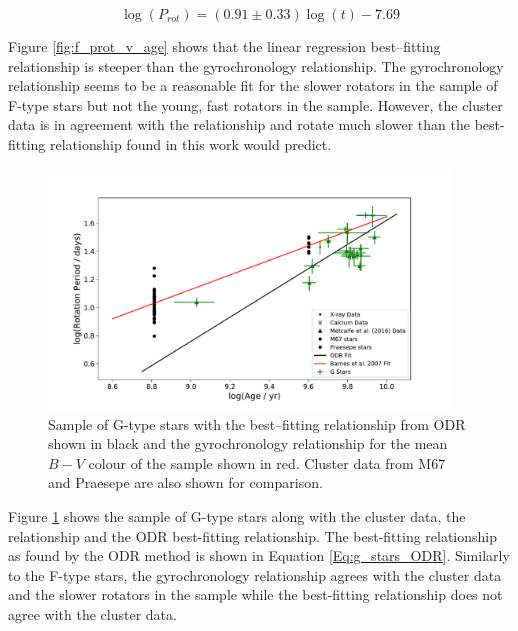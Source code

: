 \begin{equation}
    \log(P_{rot}) = (0.91 \pm 0.33)\log(t) -7.69
    \label{Eq:f_stars_lin_reg}
\end{equation}


Figure \ref{fig:f_prot_v_age} shows that the linear regression best--fitting relationship is steeper than the gyrochronology relationship. The gyrochronology relationship seems to be a reasonable fit for the slower rotators in the sample of F-type stars but not the young, fast rotators in the sample. However, the cluster data is in agreement with the \citet{Barnes_2007} relationship and rotate much slower than the best-fitting relationship found in this work would predict.

\begin{figure}[!hbt]
    \centering
    \includegraphics[width=0.95\textwidth]{Figures/5-Activity_rotation/g_prot_v_age.pdf}
    \caption[Rotation period as a function of age for G-type stars]{Sample of G-type stars with the best--fitting relationship from ODR shown in black and the \citet{Barnes_2007} gyrochronology relationship for the mean $B-V$ colour of the sample shown in red. Cluster data from M67 and Praesepe are also shown for comparison.}
    \label{fig:g_prot_v_age}
\end{figure}

Figure \ref{fig:g_prot_v_age} shows the sample of G-type stars along with the cluster data, the \citet{Barnes_2007} relationship and the ODR best-fitting relationship. The best-fitting relationship as found by the ODR method is shown in Equation \ref{Eq:g_stars_ODR}. Similarly to the F-type stars, the gyrochronology relationship agrees with the cluster data and the slower rotators in the sample while the best-fitting relationship does not agree with the cluster data.


